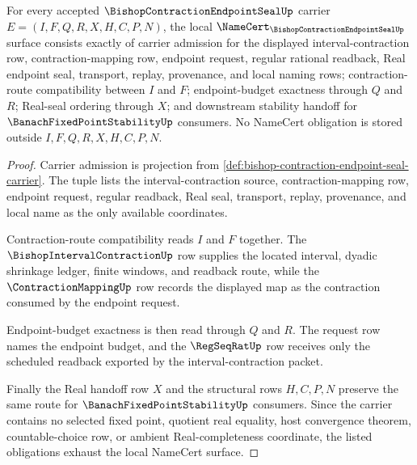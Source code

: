 \begin{theorem}
\label{thm:bishop-contraction-endpoint-seal-namecert-obligations}
For every accepted $\BishopContractionEndpointSealUp$ carrier $E=(I,F,Q,R,X,H,C,P,N)$, the local $\NameCert_{\BishopContractionEndpointSealUp}$ surface consists exactly of carrier admission for the displayed interval-contraction row, contraction-mapping row, endpoint request, regular rational readback, Real endpoint seal, transport, replay, provenance, and local naming rows; contraction-route compatibility between $I$ and $F$; endpoint-budget exactness through $Q$ and $R$; Real-seal ordering through $X$; and downstream stability handoff for $\BanachFixedPointStabilityUp$ consumers. No NameCert obligation is stored outside $I,F,Q,R,X,H,C,P,N$.
\end{theorem}
\begin{proof}
Carrier admission is projection from \autoref{def:bishop-contraction-endpoint-seal-carrier}. The tuple lists the interval-contraction source, contraction-mapping row, endpoint request, regular readback, Real seal, transport, replay, provenance, and local name as the only available coordinates.

Contraction-route compatibility reads $I$ and $F$ together. The $\BishopIntervalContractionUp$ row supplies the located interval, dyadic shrinkage ledger, finite windows, and readback route, while the $\ContractionMappingUp$ row records the displayed map as the contraction consumed by the endpoint request.

Endpoint-budget exactness is then read through $Q$ and $R$. The request row names the endpoint budget, and the $\RegSeqRatUp$ row receives only the scheduled readback exported by the interval-contraction packet.

Finally the Real handoff row $X$ and the structural rows $H,C,P,N$ preserve the same route for $\BanachFixedPointStabilityUp$ consumers. Since the carrier contains no selected fixed point, quotient real equality, host convergence theorem, countable-choice row, or ambient Real-completeness coordinate, the listed obligations exhaust the local NameCert surface.
\end{proof}

